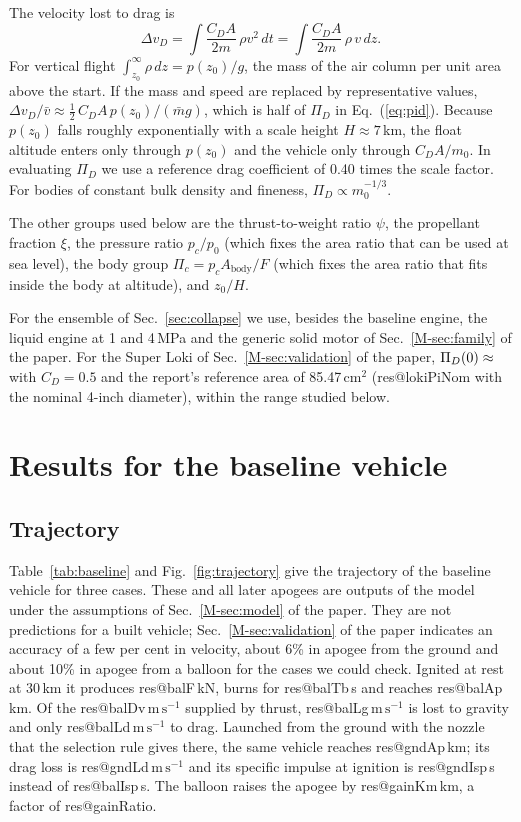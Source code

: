 \documentclass[11pt,a4paper]{article}
\makeatletter
\newcommand{\R}[1]{\csname res@#1\endcsname}
\newcommand{\ms}{\,\mathrm{m\,s^{-1}}}
\makeatother
\begin{document}
The velocity lost to drag is
\begin{equation}
\Delta v_D=\int\frac{C_DA}{2m}\,\rho v^2\,dt=\int\frac{C_DA}{2m}\,\rho\,v\,dz .
\end{equation}
For vertical flight $\int_{z_0}^{\infty}\rho\,dz=p(z_0)/g$, the mass of the air column per unit area above the start. If the mass and speed are replaced by representative values, $\Delta v_D/\bar v\approx\tfrac12\,C_DA\,p(z_0)/(\bar m g)$, which is half of $\Pi_D$ in Eq.~(\ref{eq:pid}). Because $p(z_0)$ falls roughly exponentially with a scale height $H\approx7$\,km, the float altitude enters only through $p(z_0)$ and the vehicle only through $C_DA/m_0$. In evaluating $\Pi_D$ we use a reference drag coefficient of 0.40 times the scale factor. For bodies of constant bulk density and fineness, $\Pi_D\propto m_0^{-1/3}$.

The other groups used below are the thrust-to-weight ratio $\psi$, the propellant fraction $\xi$, the pressure ratio $p_c/p_0$ (which fixes the area ratio that can be used at sea level), the body group $\Pi_c=p_cA_{\mathrm{body}}/F$ (which fixes the area ratio that fits inside the body at altitude), and $z_0/H$.

For the ensemble of Sec.~\ref{sec:collapse} we use, besides the baseline engine, the liquid engine at 1 and 4\,MPa and the generic solid motor of Sec.~\ref{M-sec:family} of the paper. For the Super Loki of Sec.~\ref{M-sec:validation} of the paper, $\Pi_D(0)\approx\R{lokiPiZero}$ with $C_D=0.5$ and the report's reference area of 85.47\,cm$^2$ (\R{lokiPiNom} with the nominal 4-inch diameter), within the range studied below.

\section{Results for the baseline vehicle}
\label{sec:baseline}

\subsection{Trajectory}

Table~\ref{tab:baseline} and Fig.~\ref{fig:trajectory} give the trajectory of the baseline vehicle for three cases. These and all later apogees are outputs of the model under the assumptions of Sec.~\ref{M-sec:model} of the paper. They are not predictions for a built vehicle; Sec.~\ref{M-sec:validation} of the paper indicates an accuracy of a few per cent in velocity, about 6\% in apogee from the ground and about 10\% in apogee from a balloon for the cases we could check. Ignited at rest at 30\,km it produces \R{balF}\,kN, burns for \R{balTb}\,s and reaches \R{balAp}\,km. Of the \R{balDv}$\ms$ supplied by thrust, \R{balLg}$\ms$ is lost to gravity and only \R{balLd}$\ms$ to drag. Launched from the ground with the nozzle that the selection rule gives there, the same vehicle reaches \R{gndAp}\,km; its drag loss is \R{gndLd}$\ms$ and its specific impulse at ignition is \R{gndIsp}\,s instead of \R{balIsp}\,s. The balloon raises the apogee by \R{gainKm}\,km, a factor of \R{gainRatio}.
\end{document}
